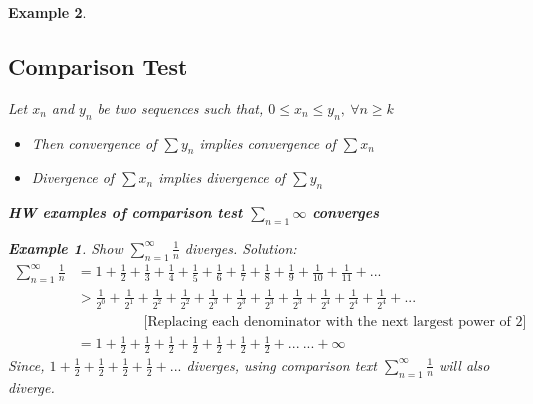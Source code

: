 \documentclass{article}
\newtheorem{example}{Example}[section]
\newcommand{\hs}{\hspace}
\newcommand{\vs}{\vspace}
\newcommand{\ds}{\displaystyle}
\begin{document}
\begin{example}
    \subsection{Comparison Test}
    Let $x_n$ and $y_n$ be two sequences such that, $0\leq x_n\leq y_n,\ \forall n \geq k$ \begin{itemize}
        \item Then convergence of $\sum y_n$ implies convergence of $\sum x_n$
        \item Divergence of $\sum x_n$ implies divergence of $\sum y_n$
    \end{itemize}
\textbf{HW examples of comparison test $\sum_{n=1}^{}\infty$ converges}\\
\begin{example}
    Show $\ds \sum_{n=1}^{\infty}\frac{1}{n}$ diverges.
    \textit{Solution: }
    \begin{align*}
        {\ds \sum_{n=1}^{\infty}\frac{1}{n}}&=1+\frac{1}{2}+\frac{1}{3}+\frac{1}{4}+\frac{1}{5}+\frac{1}{6}+\frac{1}{7}+\frac{1}{8}+\frac{1}{9}+\frac{1}{10}+\frac{1}{11}+...\\
        &>\frac{1}{2^0}+\frac{1}{2^1}+\frac{1}{2^2}+\frac{1}{2^2}+\frac{1}{2^3}+\frac{1}{2^3}+\frac{1}{2^3}+\frac{1}{2^3}+\frac{1}{2^4}+\frac{1}{2^4}+\frac{1}{2^4}+...\\
        & \hs{2cm}\text{[Replacing each denominator with the next largest power of 2]}\\
        &=1+\frac{1}{2}+\frac{1}{2}+\frac{1}{2}+\frac{1}{2}+\frac{1}{2}+\frac{1}{2}+\frac{1}{2}+... \ ...+\infty
    \end{align*}
    Since, $\ds 1+\frac{1}{2}+\frac{1}{2}+\frac{1}{2}+\frac{1}{2}+...$ diverges, using comparison text $\ds \sum_{n=1}^{\infty}\frac{1}{n}$ will also diverge.
\end{example}
\end{example}
\vs{.5cm}
\end{document}
